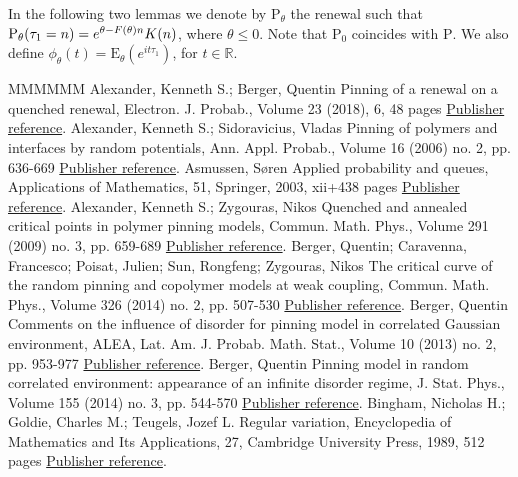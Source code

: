 \documentclass[11pt]{article}
\theoremstyle{definition}
\numberwithin{equation}{section}
\numberwithin{figure}{section}
\numberwithin{table}{section}
\newcommand{\bbR}{{\ensuremath{\mathbb R}}}
\newcommand{\gt}{\theta}
\newcommand\bP{\ensuremath{\mathrm{P}}}
\newcommand\bE{\ensuremath{\mathrm{E}}}
\begin{document}
In the following two lemmas we denote by $\bP_\gt$ the renewal such that $\bP_\gt(\tau_1 = n) =\linebreak e^{\gt - F(\gt) n} K(n)$, where $\gt\le 0$. Note that $\bP_0$ coincides with $\bP$. We also define $\phi_\gt(t) = \bE_\gt(e^{i t \tau_1})$, for $t\in\bbR$.

\begin{thebibliography}{MMMMMM}
 Alexander, Kenneth S.; Berger, Quentin Pinning of a renewal on a quenched renewal, Electron. J. Probab., Volume 23 (2018), 6, 48 pages \href{https://ahl.centre-mersenne.org/item/AHL_2019__2__281_0/#A17_1}{Publisher reference}.
 Alexander, Kenneth S.; Sidoravicius, Vladas Pinning of polymers and interfaces by random potentials, Ann. Appl. Probab., Volume 16 (2006) no. 2, pp. 636-669 \href{https://ahl.centre-mersenne.org/item/AHL_2019__2__281_0/#AS06}{Publisher reference}.
 Asmussen, Søren Applied probability and queues, Applications of Mathematics, 51, Springer, 2003, xii+438 pages \href{https://ahl.centre-mersenne.org/item/AHL_2019__2__281_0/#A2003}{Publisher reference}.
 Alexander, Kenneth S.; Zygouras, Nikos Quenched and annealed critical points in polymer pinning models, Commun. Math. Phys., Volume 291 (2009) no. 3, pp. 659-689 \href{https://ahl.centre-mersenne.org/item/AHL_2019__2__281_0/#AZ09}{Publisher reference}.
 Berger, Quentin; Caravenna, Francesco; Poisat, Julien; Sun, Rongfeng; Zygouras, Nikos The critical curve of the random pinning and copolymer models at weak coupling, Commun. Math. Phys., Volume 326 (2014) no. 2, pp. 507-530 \href{https://ahl.centre-mersenne.org/item/AHL_2019__2__281_0/#BCPSZ14}{Publisher reference}.
 Berger, Quentin Comments on the influence of disorder for pinning model in correlated Gaussian environment, ALEA, Lat. Am. J. Probab. Math. Stat., Volume 10 (2013) no. 2, pp. 953-977 \href{https://ahl.centre-mersenne.org/item/AHL_2019__2__281_0/#B13}{Publisher reference}.
 Berger, Quentin Pinning model in random correlated environment: appearance of an infinite disorder regime, J. Stat. Phys., Volume 155 (2014) no. 3, pp. 544-570 \href{https://ahl.centre-mersenne.org/item/AHL_2019__2__281_0/#B14}{Publisher reference}.
 Bingham, Nicholas H.; Goldie, Charles M.; Teugels, Jozef L. Regular variation, Encyclopedia of Mathematics and Its Applications, 27, Cambridge University Press, 1989, 512 pages \href{https://ahl.centre-mersenne.org/item/AHL_2019__2__281_0/#BGT89}{Publisher reference}.

\end{thebibliography}
\end{document}
